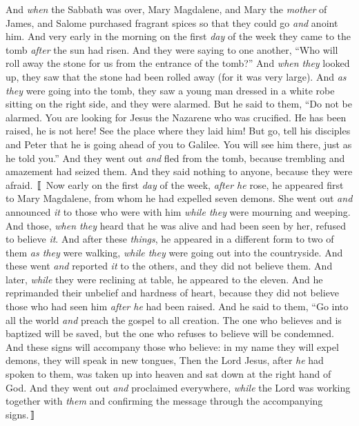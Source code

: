 \begin{biblechapter} %
 And \textit{when} the Sabbath was over, Mary Magdalene, and Mary the \textit{mother} of James, and Salome purchased fragrant spices so that they could go \textit{and} anoint him.
\verse And very early in the morning on the first \textit{day} of the week they came to the tomb \textit{after} the sun had risen.
\verse And they were saying to one another, “Who will roll away the stone for us from the entrance of the tomb?”
\verse And \textit{when they} looked up, they saw that the stone had been rolled away (for it was very large).
\verse And \textit{as they} were going into the tomb, they saw a young man dressed in a white robe sitting on the right side, and they were alarmed.
\verse But he said to them, “Do not be alarmed. You are looking for Jesus the Nazarene who was crucified. He has been raised, he is not here! See the place where they laid him!
\verse But go, tell his disciples and Peter that he is going ahead of you to Galilee. You will see him there, just as he told you.”
\verse And they went out \textit{and} fled from the tomb, because trembling and amazement had seized them. And they said nothing to anyone, because they were afraid.
 〚
\verse Now early on the first \textit{day} of the week, \textit{after he} rose, he appeared first to Mary Magdalene, from whom he had expelled seven demons.
\verse She went out \textit{and} announced \textit{it} to those who were with him \textit{while they} were mourning and weeping.
\verse And those, \textit{when they} heard that he was alive and had been seen by her, refused to believe \textit{it}.
\verse And after these \textit{things}, he appeared in a different form to two of them \textit{as they} were walking, \textit{while they} were going out into the countryside.
\verse And these went \textit{and} reported \textit{it} to the others, and they did not believe them.
\verse And later, \textit{while} they were reclining at table, he appeared to the eleven. And he reprimanded their unbelief and hardness of heart, because they did not believe those who had seen him \textit{after he} had been raised.
\verse And he said to them, “Go into all the world \textit{and} preach the gospel to all creation.
\verse The one who believes and is baptized will be saved, but the one who refuses to believe will be condemned.
\verse And these signs will accompany those who believe: in my name they will expel demons, they will speak in new tongues,
\verse Then the Lord Jesus, after \textit{he} had spoken to them, was taken up into heaven and sat down at the right hand of God.
\verse And they went out \textit{and} proclaimed everywhere, \textit{while} the Lord was working together with \textit{them} and confirming the message through the accompanying signs.〛
\end{biblechapter}

